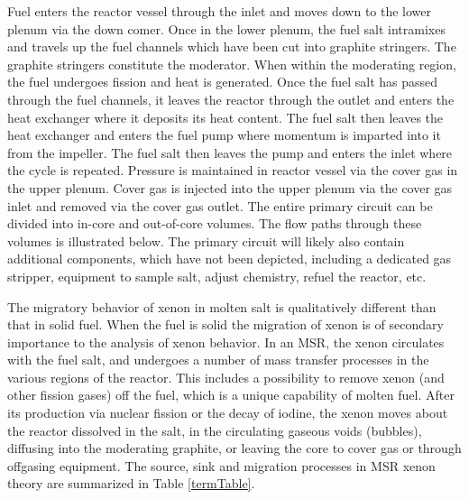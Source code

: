 Fuel enters the reactor vessel through the inlet and moves down to the lower plenum via the down comer.  Once in the lower plenum, the fuel salt intramixes and travels up the fuel channels which have been cut into graphite stringers.  The graphite stringers constitute the moderator. When within the moderating region, the fuel undergoes fission and heat is generated. Once the fuel salt has passed through the fuel channels, it leaves the reactor through the outlet and enters the heat exchanger where it deposits its heat content. The fuel salt then leaves the heat exchanger and enters the fuel pump where momentum is imparted into it from the impeller. The fuel salt then leaves the pump and enters the inlet where the cycle is repeated. Pressure is maintained in reactor vessel via the cover gas in the upper plenum.  Cover gas is injected into the upper plenum via the cover gas inlet and removed via the cover gas outlet.  The entire primary circuit can be divided into in-core and out-of-core volumes. The flow paths through these volumes is illustrated below. The primary circuit will likely also contain additional components, which have not been depicted, including a dedicated gas stripper, equipment to sample salt, adjust chemistry, refuel the reactor, etc.

The migratory behavior of xenon in molten salt is qualitatively different than that in solid fuel.  When the fuel is solid the migration of xenon is of secondary importance to the analysis of xenon behavior. In an MSR, the xenon circulates with the fuel salt, and undergoes a number of mass transfer processes in the various regions of the reactor. This includes a possibility to remove xenon (and other fission gases) off the fuel, which is a unique capability of molten fuel.   After its production via nuclear fission or the decay of iodine, the xenon moves about the reactor dissolved in the salt, in the circulating gaseous voids (bubbles), diffusing into the moderating graphite, or leaving the core to cover gas or through offgasing equipment.  The source, sink and migration processes in MSR xenon theory are summarized in Table \ref{termTable}.


